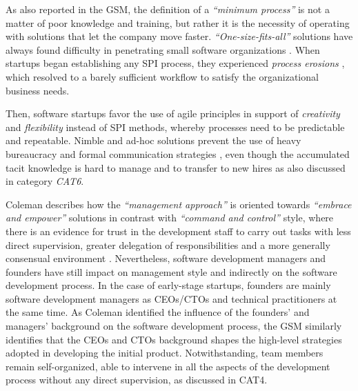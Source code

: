 \documentclass[10pt,journal,letterpaper,compsoc]{IEEEtran}
\begin{document}
As also reported in the GSM, the definition of a \textit{``minimum process''} 
is not a matter of poor knowledge and training, but rather it is the necessity 
of operating with solutions that let the company move faster. 
\textit{``One-size-fits-all''} solutions have always found difficulty in 
penetrating small software organizations \cite{Staples2007}. When startups began 
establishing any SPI process, they experienced \textit{process erosions}  
\cite{Coleman2008} %
, which resolved to a barely sufficient workflow to satisfy the organizational 
business needs.

Then, software startups favor the use of agile principles in support of 
\textit{creativity} and \textit{flexibility} instead of SPI methods, whereby 
processes need to be predictable and repeatable. Nimble and ad-hoc solutions 
prevent the use of heavy bureaucracy and formal communication strategies %
, even though the accumulated tacit knowledge is hard to manage and to transfer 
to new hires as also discussed in category \textit{CAT6}.

Coleman describes how the \textit{``management approach''} is oriented towards 
\textit{``embrace and empower''} solutions in contrast with \textit{``command 
and control''} style, where there is an evidence for trust in the  development 
staff to carry out tasks with less direct supervision, greater delegation of 
responsibilities and a more generally consensual environment \cite{Coleman2008}. 
Nevertheless, software development managers and founders have still impact on 
management style and indirectly on the software development process. In the case 
of early-stage startups, founders are mainly software development managers as 
CEOs/CTOs and  technical practitioners at the same time. As Coleman identified 
the influence of the founders' and managers' background on the software 
development process, the GSM similarly identifies that the CEOs and CTOs 
background shapes the high-level strategies adopted in developing the initial 
product. Notwithstanding, team members remain self-organized, able to intervene 
in all the aspects of the development process without any direct supervision, as 
discussed in CAT4.
\end{document}
